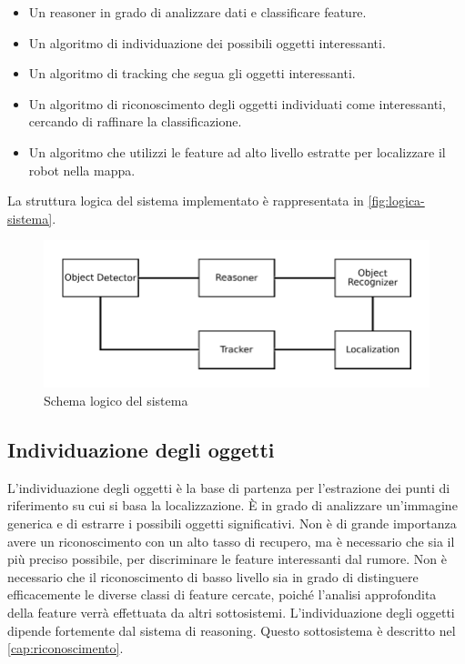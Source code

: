 \begin{itemize}
 \item Un reasoner in grado di analizzare dati e classificare feature.
 \item Un algoritmo di individuazione dei possibili oggetti interessanti.
 \item Un algoritmo di tracking che segua gli oggetti interessanti.
 \item Un algoritmo di riconoscimento degli oggetti individuati come interessanti, cercando di raffinare la classificazione.
 \item Un algoritmo che utilizzi le feature ad alto livello estratte per localizzare il robot nella mappa.
\end{itemize}

La struttura logica del sistema implementato è rappresentata in \autoref{fig:logica-sistema}.

\begin{figure}[ht]
  \includegraphics[width=\textwidth]{diagrammi/SchemaLogico}
  \caption{Schema logico del sistema}
  \label{fig:logica-sistema}
\end{figure}

\subsection{Individuazione degli oggetti}
L'individuazione degli oggetti è la base di partenza per l'estrazione dei punti di riferimento su cui si basa la localizzazione.
\`E in grado di analizzare un'immagine generica e di estrarre i possibili oggetti significativi. Non è di grande importanza avere un riconoscimento con un alto tasso di recupero, ma è necessario che sia il più preciso possibile, per discriminare le feature interessanti dal rumore.
Non è necessario che il riconoscimento di basso livello 
sia in grado di distinguere efficacemente le diverse classi di feature cercate, poiché l'analisi approfondita della feature verrà effettuata da altri sottosistemi.
L'individuazione degli oggetti dipende fortemente dal sistema di reasoning.
Questo sottosistema è descritto nel \autoref{cap:riconoscimento}.

